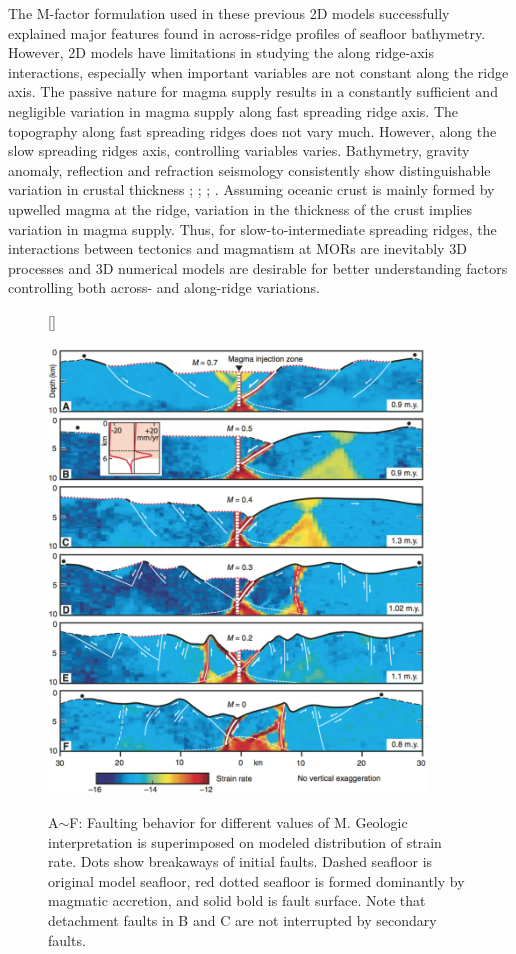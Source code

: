 \documentclass[12pt]{article}
\begin{document}
The M-factor formulation used in these previous 2D models successfully explained major features found in across-ridge profiles of seafloor bathymetry. However, 2D models have limitations in studying the along ridge-axis interactions, especially when important variables are not constant along the ridge axis. The passive nature for magma supply results in a constantly sufficient and negligible variation in magma supply along fast spreading ridge axis. The topography along fast spreading ridges does not vary much. However, along the slow spreading ridges axis, controlling variables varies. Bathymetry, gravity anomaly, reflection and refraction seismology consistently show distinguishable variation in crustal thickness \citep{Ryan2009}; \citep{Chen1999}; \citep{Lin1990}; \citep{Tolstoy1993}. Assuming oceanic crust is mainly formed by upwelled magma at the ridge, variation in the thickness of the crust implies variation in magma supply. Thus, for slow-to-intermediate spreading ridges, the interactions between tectonics and magmatism at MORs are inevitably 3D processes and 3D numerical models are desirable for better understanding factors controlling both across- and along-ridge variations. 
\begin{figure}[H]
[\FBwidth]
{\caption{\small A$\sim$F: Faulting behavior for different values of M. Geologic interpretation is superimposed on modeled distribution of strain rate. Dots show breakaways of initial faults. Dashed seafloor is original model seafloor, red dotted seafloor is formed dominantly by magmatic accretion, and solid bold is fault surface. Note that detachment faults in B and C are not interrupted by secondary faults. \citep{Tucholke2008}}}
 {\includegraphics[width=10cm]{fig6_1.png}} 
 \label{fig6_1}
\end{figure}
\end{document}
